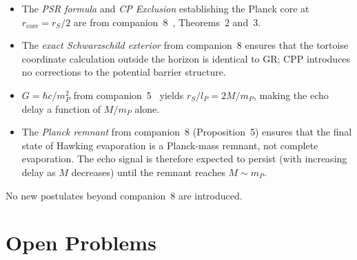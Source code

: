 \documentclass[12pt]{article}
\newcommand{\lP}{l_P}
\newcommand{\mP}{m_P}
\newcommand{\rS}{r_S}
\newcommand{\rcore}{r_{\mathrm{core}}}
\begin{document}
\begin{itemize}[noitemsep]
  \item The \emph{PSR formula} and \emph{CP Exclusion} establishing the
    Planck core at $\rcore = \rS/2$ are from companion~8~\cite{c8},
    Theorems~2 and~3.
  \item The \emph{exact Schwarzschild exterior} from companion~8 ensures
    that the tortoise coordinate calculation outside the horizon is
    identical to GR; CPP introduces no corrections to the potential
    barrier structure.
  \item $G = \hbar c/\mP^2$ from companion~5~\cite{c5} yields
    $\rS/\lP = 2M/\mP$, making the echo delay a function of $M/\mP$
    alone.
  \item The \emph{Planck remnant} from companion~8 (Proposition~5)
    ensures that the final state of Hawking evaporation is a Planck-mass
    remnant, not complete evaporation.  The echo signal is therefore
    expected to persist (with increasing delay as $M$ decreases) until
    the remnant reaches $M \sim \mP$.
\end{itemize}

No new postulates beyond companion~8 are introduced.

\section{Open Problems}
\label{sec:open}
\end{document}
